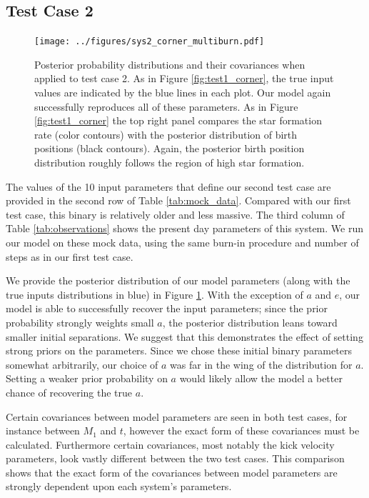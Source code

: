 \documentclass[12pt, preprint]{aastex}
\begin{document}
\subsection{Test Case 2}

\begin{figure}[h!]
\begin{center}
\texttt{[image: ../figures/sys2\_corner\_multiburn.pdf]}
\caption{Posterior probability distributions and their covariances when applied to test case 2. As in Figure \ref{fig:test1_corner}, the true input values are indicated by the blue lines in each plot. Our model again successfully reproduces all of these parameters. As in Figure \ref{fig:test1_corner} the top right panel compares the star formation rate (color contours) with the posterior distribution of birth positions (black contours). Again, the posterior birth position distribution roughly follows the region of high star formation.}
\label{fig:test2_corner}
\end{center}
\end{figure}

The values of the 10 input parameters that define our second test case are provided in the second row of Table \ref{tab:mock_data}. Compared with our first test case, this binary is relatively older and less massive. The third column of Table \ref{tab:observations} shows the present day parameters of this system. We run our model on these mock data, using the same burn-in procedure and number of steps as in our first test case.

We provide the posterior distribution of our model parameters (along with the true inputs distributions in blue) in Figure \ref{fig:test2_corner}. With the exception of $a$ and $e$, our model is able to successfully recover the input parameters; since the prior probability strongly weights small $a$, the posterior distribution leans toward smaller initial separations. We suggest that this demonstrates the effect of setting strong priors on the parameters. Since we chose these initial binary parameters somewhat arbitrarily, our choice of $a$ was far in the wing of the distribution for $a$. Setting a weaker prior probability on $a$ would likely allow the model a better chance of recovering the true $a$.

Certain covariances between model parameters are seen in both test cases, for instance between $M_1$ and $t$, however the exact form of these covariances must be calculated. Furthermore certain covariances, most notably the kick velocity parameters, look vastly different between the two test cases. This comparison shows that the exact form of the covariances between model parameters are strongly dependent upon each system's parameters. 
\end{document}
